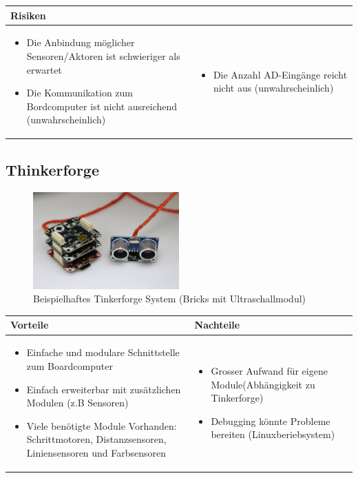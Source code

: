\begin{table}[h]
\begin{tabular}{p{}p{}}


 \textbf{Risiken} & \\ \hline
	 
\begin{itemize}
\item Die Anbindung möglicher Sensoren/Aktoren ist schwieriger als erwartet
\item Die Kommunikation zum Bordcomputer ist nicht ausreichend (unwahrscheinlich)
\end{itemize}
&
\begin{itemize}
\item Die Anzahl AD-Eingänge reicht nicht aus (unwahrscheinlich)
\end{itemize}

 
\end{tabular}
\end{table}

\pagebreak


\subsection{Thinkerforge}
\begin{figure}[h]
	\centering
	\includegraphics[width=0.5\textwidth]{fig/Tinkerforge.png}
	\caption{Beispielhaftes Tinkerforge System (Bricks mit Ultraschallmodul)}
\end{figure}

\begin{table}[h]
\begin{tabular}{p{} | p{}}


\textbf{Vorteile} & \textbf{Nachteile} \\ \hline
	 
\begin{itemize}
\item Einfache und modulare Schnittstelle zum Boardcomputer
\item Einfach erweiterbar mit zusätzlichen Modulen (z.B Sensoren)
\item Viele benötigte Module Vorhanden: Schrittmotoren, Distanzsensoren, Liniensensoren und Farbsensoren
\end{itemize}
 &
\begin{itemize}
\item Grosser Aufwand für eigene Module(Abhängigkeit zu Tinkerforge)
\item Debugging könnte Probleme bereiten (Linuxberiebsystem) 
\end{itemize}
\end{tabular}
\end{table}


